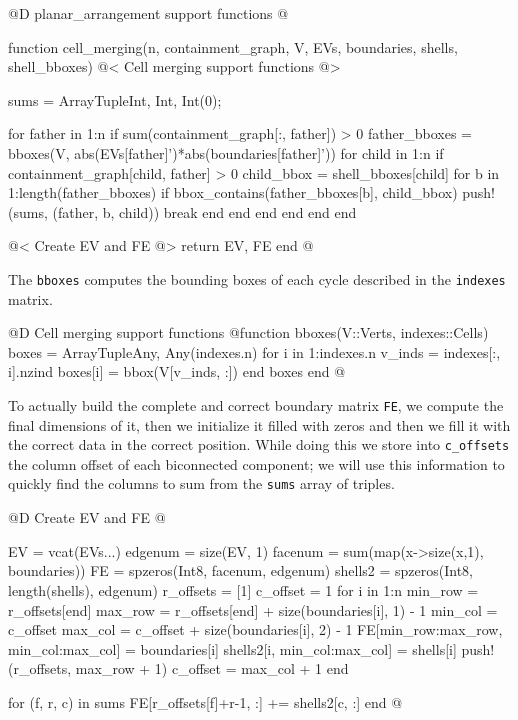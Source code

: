 @D planar\_arrangement support functions 
@{function cell_merging(n, containment_graph, V, EVs, boundaries, shells, shell_bboxes)
    @< Cell merging support functions @>

    sums = Array{Tuple{Int, Int, Int}}(0);

    for father in 1:n
        if sum(containment_graph[:, father]) > 0
            father_bboxes = bboxes(V, abs(EVs[father]')*abs(boundaries[father]'))
            for child in 1:n
                if containment_graph[child, father] > 0
                    child_bbox = shell_bboxes[child]
                    for b in 1:length(father_bboxes)
                        if bbox_contains(father_bboxes[b], child_bbox)
                            push!(sums, (father, b, child))
                            break
                        end
                    end
                end            
            end
        end
    end

    @< Create EV and FE @>
    return EV, FE
end
@}

The \texttt{bboxes} computes the bounding boxes of each cycle
described in the \texttt{indexes} matrix.

@D Cell merging support functions
@{function bboxes(V::Verts, indexes::Cells)
    boxes = Array{Tuple{Any, Any}}(indexes.n)
    for i in 1:indexes.n
        v_inds = indexes[:, i].nzind
        boxes[i] = bbox(V[v_inds, :])
    end
    boxes
end
@}

To actually build the complete and correct boundary matrix \texttt{FE},
we compute the final dimensions of it, then we initialize it filled with
zeros and then we fill it with the correct data in the correct position.
While doing this we store into \texttt{c\_offsets} the column offset of each
biconnected component; we will use this information to quickly find the columns 
to sum from the \texttt{sums} array of triples.

@D Create EV and FE
@{EV = vcat(EVs...)
edgenum = size(EV, 1)
facenum = sum(map(x->size(x,1), boundaries))
FE = spzeros(Int8, facenum, edgenum)
shells2 = spzeros(Int8, length(shells), edgenum)
r_offsets = [1]
c_offset = 1
for i in 1:n
    min_row = r_offsets[end]
    max_row = r_offsets[end] + size(boundaries[i], 1) - 1
    min_col = c_offset
    max_col = c_offset + size(boundaries[i], 2) - 1
    FE[min_row:max_row, min_col:max_col] = boundaries[i]
    shells2[i, min_col:max_col] = shells[i]
    push!(r_offsets, max_row + 1)
    c_offset = max_col + 1
end

for (f, r, c) in sums
    FE[r_offsets[f]+r-1, :] += shells2[c, :]
end
@}


